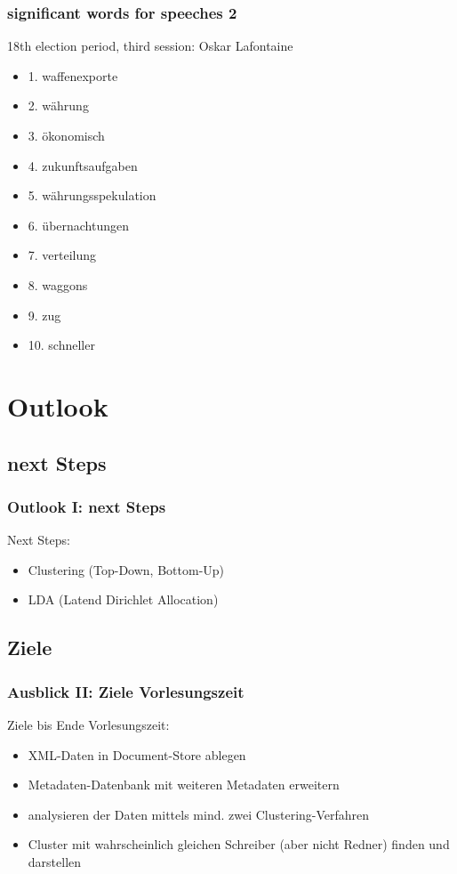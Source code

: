 \documentclass[11pt, a4paper]{beamer}
\begin{document}
\begin{frame}
\frametitle{significant words for speeches 2}
18th election period, third session: Oskar Lafontaine
\begin{itemize}
\item 1. waffenexporte
\item 2. währung
\item 3. ökonomisch
\item 4. zukunftsaufgaben
\item 5. währungsspekulation
\item 6. übernachtungen
\item 7. verteilung
\item 8. waggons
\item 9. zug
\item 10. schneller
\end{itemize}
\end{frame}

\section{Outlook}

\subsection{next Steps}
\begin{frame}
\frametitle{Outlook I: next Steps}
Next Steps:
\begin{itemize}
	\item Clustering (Top-Down, Bottom-Up)
	\item LDA (Latend Dirichlet Allocation)
\end{itemize}
\end{frame}

\subsection{Ziele}
\begin{frame}
\frametitle{Ausblick II: Ziele Vorlesungszeit}

Ziele bis Ende Vorlesungszeit:
\begin{itemize}
	\item XML-Daten in Document-Store ablegen
	\item Metadaten-Datenbank mit weiteren Metadaten erweitern
	\item analysieren der Daten mittels mind. zwei Clustering-Verfahren 
	\item Cluster mit wahrscheinlich gleichen Schreiber (aber nicht Redner) finden und darstellen
\end{itemize}
\end{frame}
\end{document}

